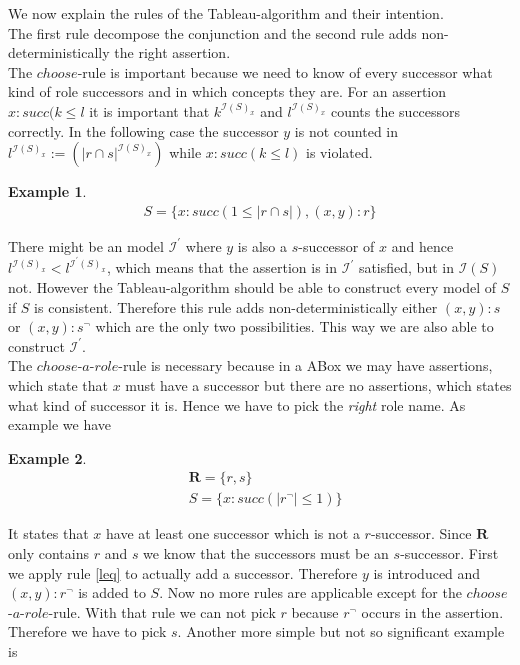 \documentclass[a4paper,11pt]{scrartcl}
\theoremstyle{break}
\theoremstyle{definition}
\newtheorem{ex}{Example}
\begin{document}
We now explain the rules of the Tableau-algorithm and their intention.\\
The first rule decompose the conjunction and the second rule adds non-deterministically the right assertion.\\
The $choose$-rule is important because we need to know of every successor what kind of role successors and in which concepts they are. For an assertion $x:succ(k\leq l$ it is important that $k^{\mathcal{I}(S)_x}$ and $l^{\mathcal{I}(S)_x}$ counts the successors correctly. In the following case the successor $y$ is not counted in $l^{\mathcal{I}(S)_x}:=(|r\cap s|^{\mathcal{I}(S)_x})$ while $x:succ(k\leq l)$ is violated.
\begin{ex}
\begin{align*}
S=\{x:succ(1\leq|r\cap s|), (x,y):r\}
\end{align*}
\end{ex}
There might be an model $\mathcal{I^\prime}$ where $y$ is also a $s$-successor of $x$ and hence $l^{\mathcal{I}(S)_x}<l^{\mathcal{I}^\prime(S)_x}$, which means that the assertion is in $\mathcal{I}^\prime$ satisfied, but in $\mathcal{I}(S)$ not. However the Tableau-algorithm should be able to construct every model of $S$ if $S$ is consistent. Therefore this rule adds non-deterministically either $(x,y):s$ or $(x,y):s^\neg$ which are the only two possibilities. This way we are also able to construct $\mathcal{I^\prime}$.\\
The $choose$-$a$-$role$-rule is necessary because in a ABox we may have assertions, which state that $x$ must have a successor but there are no assertions, which states what kind of successor it is. Hence we have to pick the \textit{right} role name. As example we have
\begin{ex}
\begin{align*}
&\mathbf{R}=\{r,s\}\\
&S=\{x:succ(|r^\neg|\leq 1)\}
\end{align*} 
\end{ex}
It states that $x$ have at least one successor which is not a $r$-successor. Since $\mathbf{R}$ only contains $r$ and $s$ we know that the successors must be an $s$-successor. First we apply rule \ref{leq} to actually add a successor. Therefore $y$ is introduced and $(x,y):r^\neg$ is added to $S$. Now no more rules are applicable except for the $choose$-$a$-$role$-rule. With that rule we can not pick $r$ because $r^\neg$ occurs in the assertion. Therefore we have to pick $s$. Another more simple but not so significant example is
\end{document}
